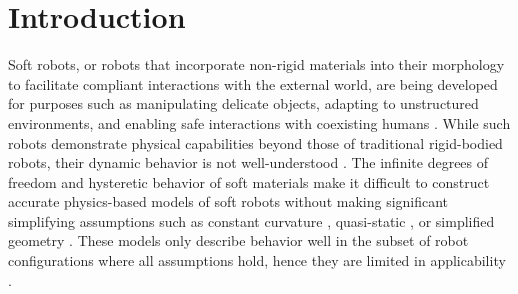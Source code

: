 \section{Introduction}
\label{sec:intro}

Soft robots, or robots that incorporate non-rigid materials into their morphology to facilitate compliant interactions with the external world, are being developed for purposes such as manipulating delicate objects, adapting to unstructured environments, and enabling safe interactions with coexisting humans \cite{rus2015design}. 
While such robots demonstrate physical capabilities beyond those of traditional rigid-bodied robots, their dynamic behavior is not well-understood \cite{george2018control}.
The infinite degrees of freedom and hysteretic  behavior of soft materials make it difficult to construct accurate physics-based models of soft robots without making significant simplifying assumptions such as constant curvature \cite{rus2015design}, quasi-static \cite{george2018control}, or simplified geometry \cite{bruder2017model, sedal2017constitutive, bishop2012parallel} .
These models 
only describe behavior well in the subset of robot configurations where all assumptions hold, hence they are limited in applicability .

